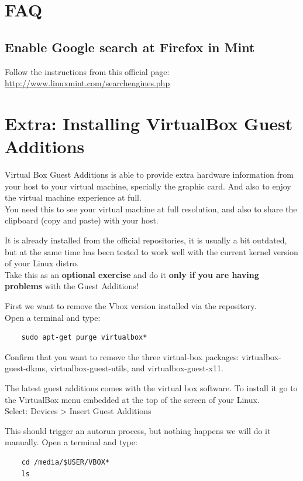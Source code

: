 \documentclass[a4paper]{article}
\begin{document}
\section{FAQ}
\subsection{Enable Google search at Firefox in Mint}
Follow the instructions from this official page: \url{http://www.linuxmint.com/searchengines.php}\\

\section{Extra: Installing VirtualBox Guest Additions}
Virtual Box Guest Additions is able to provide extra hardware information from your host to your virtual machine, specially the graphic card. And also to enjoy the virtual machine experience at full.\\
\noindent
You need this to see your virtual machine at full resolution, and also to share the clipboard (copy and paste) with your host.

It is already installed from the official repositories, it is usually a bit outdated, but at the same time has been tested to work well with the current kernel version of your Linux distro.\\
Take this as an \textbf{optional exercise} and do it \textbf{only if you are having problems} with the Guest Additions!

First we want to remove the Vbox version installed via the repository.\\
Open a terminal and type:
\begin{lstlisting}
    sudo apt-get purge virtualbox*
\end{lstlisting}
Confirm that you want to remove the three virtual-box packages: virtualbox-guest-dkms, virtualbox-guest-utils, and virtualbox-guest-x11.

The latest guest additions comes with the virtual box software. To install it go to the VirtualBox menu embedded at the top of the screen of your Linux.\\
\noindent Select: Devices > Insert Guest Additions

\noindent This should trigger an autorun process, but nothing happens we will do it manually. Open a terminal and type:

\begin{lstlisting}
    cd /media/$USER/VBOX*
    ls
\end{lstlisting}
\end{document}
